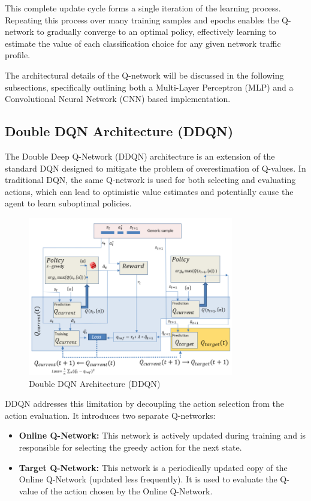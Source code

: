 \documentclass[12pt]{report}
\begin{document}
This complete update cycle forms a single iteration of the learning process. Repeating this process over many training samples and epochs enables the Q-network to gradually converge to an optimal policy, effectively learning to estimate the value of each classification choice for any given network traffic profile.

The architectural details of the Q-network will be discussed in the following subsections, specifically outlining both a Multi-Layer Perceptron (MLP) and a Convolutional Neural Network (CNN) based implementation.

\subsection{Double DQN Architecture (DDQN)}

The Double Deep Q-Network (DDQN) architecture is an extension of the standard DQN designed to mitigate the problem of overestimation of Q-values. In traditional DQN, the same Q-network is used for both selecting and evaluating actions, which can lead to optimistic value estimates and potentially cause the agent to learn suboptimal policies.

\begin{figure}[htbp]
    \centering
    \includegraphics[width=0.8\textwidth]{images/ddqn-arch.png}
    \caption{Double DQN Architecture (DDQN)}
    \label{fig:ddqn-arch}
\end{figure}


DDQN addresses this limitation by decoupling the action selection from the action evaluation. It introduces two separate Q-networks:

\begin{itemize}
    \item \textbf{Online Q-Network:} This network is actively updated during training and is responsible for selecting the greedy action for the next state.
    
    \item \textbf{Target Q-Network:} This network is a periodically updated copy of the Online Q-Network (updated less frequently). It is used to evaluate the Q-value of the action chosen by the Online Q-Network.
\end{itemize}
\end{document}
